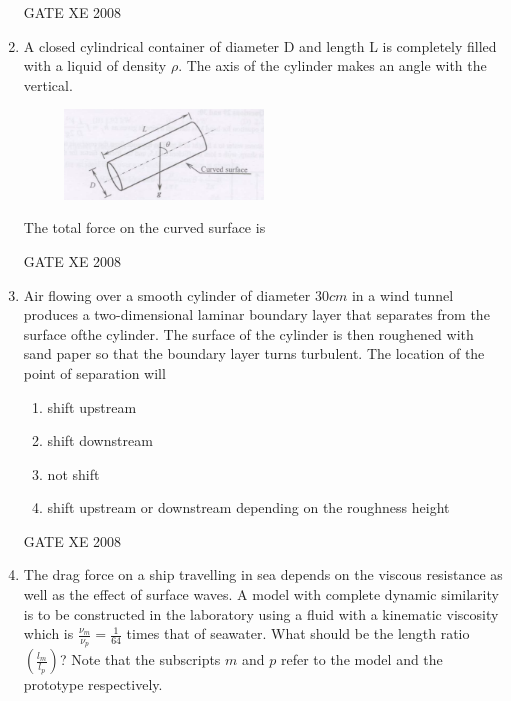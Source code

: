 \documentclass[12pt]{article}
\begin{document}
\begin{enumerate}
GATE XE 2008
\item  A closed cylindrical container of diameter D and length L is completely filled with a liquid of density $\rho$. The axis of the cylinder makes an angle with the vertical.

\begin{figure}[H]
\centering
  \includegraphics[width=0.5\textwidth]{figs/ass1_d_q25.png}
  \caption{}
\end{figure} 

The total force on the curved surface is

\begin{enumerate}
\end{enumerate}

GATE XE 2008
\item  Air flowing over a smooth cylinder of diameter $30 cm$ in a wind tunnel produces a two-dimensional laminar boundary layer that separates from the surface ofthe cylinder. The surface of the cylinder is then roughened with sand paper so that the boundary layer turns turbulent. The location of the point of separation will

\begin{enumerate}
\item  shift upstream

\item  shift downstream

\item  not shift

\item  shift upstream or downstream depending on the roughness height
\end{enumerate}

GATE XE 2008
\item The drag force on a ship travelling in sea depends on the viscous resistance as well as the effect of surface waves. A model with complete dynamic similarity is to be constructed in the laboratory using a fluid with a kinematic viscosity which is $\frac{\nu_m}{\nu_p} = \frac{1}{64}$ times that of seawater. What should be the length ratio $\left( \frac{l_m}{l_p} \right)$? Note that the subscripts $m$ and $p$ refer to the model and the prototype respectively.  


\end{enumerate}
\end{document}
